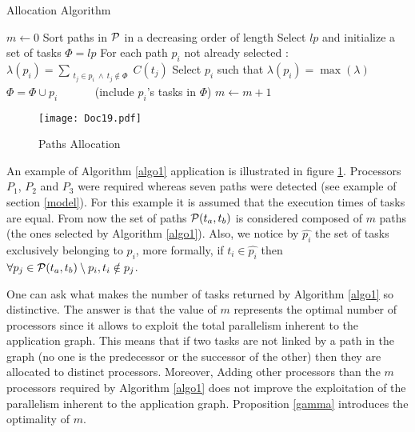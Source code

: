 \documentclass{ijcaArticle}
\begin{document}
\begin{algorithm} 
\caption{Allocation Algorithm} 
\label{algo1} \begin{algorithmic}[1] 
\STATE  $m \leftarrow 0$ 
\STATE Sort paths in ${\cal P}$ in a decreasing order of length
\STATE Select $lp$  and initialize a set of tasks $\Phi = lp$  
\STATE For each path $p_i$ not already selected : \\ $\lambda(p_i) = \sum\limits_{\substack{t_j \in p_i \ \wedge \ t_j \notin \Phi}} C(t_j)$ 
\STATE Select $p_i$ such that $\lambda(p_i) =\max (\lambda) $ 
\STATE $\Phi = \Phi \cup p_i$  \ \ \ \ \ \ (include $p_i$\rq{}s tasks in  $\Phi$)
\STATE $m \leftarrow m + 1$
\ENDWHILE 
\end{algorithmic} 
\end{algorithm}

\begin{figure}[h!] 
\begin{center} 
\texttt{[image: Doc19.pdf]} 
\caption{Paths Allocation} 
\label{cons-clust-exam} \end{center} 
\end{figure}
 
An example of Algorithm \ref{algo1} application is illustrated in figure \ref{cons-clust-exam}. Processors $P_1$, $P_2$ and $P_3$ were required whereas seven paths were detected (see example of section \ref{model}). For this example it is assumed that the execution times of tasks are equal.  From now the set of paths 
${\cal P}(t_a,t_b)$ is considered composed of $m$ paths (the ones selected by Algorithm \ref{algo1}). Also, we notice by $\widehat{p_i}$ the set of tasks exclusively belonging to $p_i$, more formally, if $t_i \in \widehat{p_i}$  then $\forall p_j \in {\cal P}(t_a,t_b) \setminus p_i , t_i \notin p_j$. 

 
One can ask what makes the number of tasks returned by Algorithm \ref{algo1} so distinctive. The answer is that the value of $m$ represents the optimal number of processors since it allows to exploit the total parallelism inherent to the application graph. This means that if two tasks are not linked by a path in the graph (no one is the predecessor or the successor of the other) then
they are allocated to distinct processors. Moreover,  Adding other processors than the $m$ processors required by Algorithm \ref{algo1} does not improve the exploitation of the parallelism inherent to the application graph. Proposition \ref{gamma} introduces the optimality of $m$.
\end{document}

